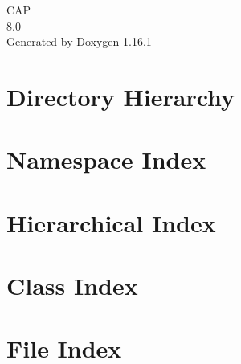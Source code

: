 \documentclass[twoside]{book}
\newcommand{\+}{\discretionary{\mbox{\scriptsize$\hookleftarrow$}}{}{}}
\newcommand{\clearemptydoublepage}{%
    \newpage{\pagestyle{empty}\cleardoublepage}%
  }
\begin{document}
  \raggedbottom
    \hypersetup{pageanchor=false,
                bookmarksnumbered=true,
                pdfencoding=unicode
               }
  \begin{titlepage}
  \vspace*{7cm}
  \begin{center}%
  {\Large CAP}\\
  [1ex]\large 8.\+0 \\
  \vspace*{1cm}
  {\large Generated by Doxygen 1.16.1}\\
  \end{center}
  \end{titlepage}
  \clearemptydoublepage
  \tableofcontents
  \clearemptydoublepage
  \hypersetup{pageanchor=true}
\chapter{Directory Hierarchy}

\chapter{Namespace Index}

\chapter{Hierarchical Index}

\chapter{Class Index}

\chapter{File Index}

\end{document}
